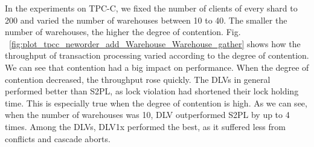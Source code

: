 \documentclass[conference]{IEEEtran}
\begin{document}
In the experiments on TPC-C, we fixed the number of clients of every shard to 200 and varied the number of warehouses between 10 to 40.
The smaller the number of warehouses, the higher the degree of contention. 
Fig. ~\ref{fig:plot_tpcc_neworder_add_Warehouse_Warehouse_gather} shows how the throughput of transaction processing varied according to the degree of contention.
We can see that contention had a big impact on performance. When the degree of contention decreased, the throughput rose quickly.
The DLVs in general performed better than S2PL, as lock violation had shortened their lock holding time. 
This is especially true when the degree of contention is high. As we can see, when the number of warehouses was 10, DLV outperformed S2PL by up to 4 times.
Among the DLVs, DLV1x performed the best, as it suffered less from conflicts and cascade aborts.
\end{document}
